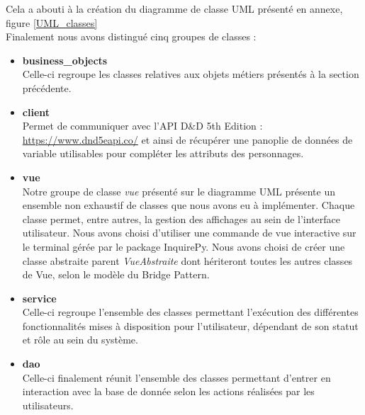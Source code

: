 \documentclass[11pt]{article}
\begin{document}
Cela a abouti à la création du diagramme de classe UML présenté en annexe, figure \ref{UML_classes} \\
Finalement nous avons distingué cinq groupes de classes :

\begin{itemize}
    \item \textbf{business\_objects} \\
    Celle-ci regroupe les classes relatives aux objets métiers présentés à la section précédente.
    \item \textbf{client} \\
    Permet de communiquer avec l'API D\&D 5th Edition  : \href{https://www.dnd5eapi.co/}{https://www.dnd5eapi.co/} et ainsi de récupérer une panoplie de données de variable utilisables pour compléter les attributs des personnages.
    \item \textbf{vue} \\
    Notre groupe de classe \textit{vue} présenté sur le diagramme UML présente un ensemble non exhaustif de classes que nous avons eu à implémenter. Chaque classe permet, entre autres, la gestion des affichages au sein de l'interface utilisateur. Nous avons choisi d'utiliser une commande de vue interactive sur le terminal gérée par le package InquirePy.
    Nous avons choisi de créer une classe abstraite parent \textit{VueAbstraite} dont hériteront toutes les autres classes de Vue, selon le modèle du Bridge Pattern.
    \item \textbf{service} \\
    Celle-ci regroupe l'ensemble des classes permettant l'exécution des différentes fonctionnalités mises à disposition pour l'utilisateur, dépendant de son statut et rôle au sein du système.
    \item \textbf{dao} \\
    Celle-ci finalement réunit l'ensemble des classes permettant d'entrer en interaction avec la base de donnée selon les actions réalisées par les utilisateurs.
\end{itemize}
\end{document}
